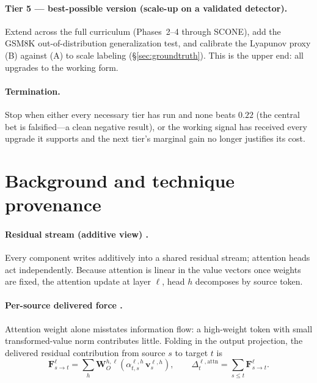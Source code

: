 \documentclass[11pt]{article}
\newcommand{\F}{\mathbf{F}}
\newcommand{\WO}{\mathbf{W}_O}
\newcommand{\vv}{\mathbf{v}}
\begin{document}
\paragraph{Tier 5 --- best-possible version (scale-up on a validated detector).}
Extend across the full curriculum (Phases~2--4 through SCONE), add the GSM8K out-of-distribution
generalization test, and calibrate the Lyapunov proxy (B) against (A) to scale labeling
(\S\ref{sec:groundtruth}). This is the upper end: all upgrades to the working form.

\paragraph{Termination.} Stop when either every necessary tier has run and none beats $0.22$ (the
central bet is falsified---a clean negative result), or the working signal has received every upgrade it
supports and the next tier's marginal gain no longer justifies its cost.

\section{Background and technique provenance}
\label{sec:background}
\paragraph{Residual stream (additive view) \cite{elhage2021mathematical}.}
Every component writes additively into a shared residual stream; attention heads act independently.
Because attention is linear in the value vectors once weights are fixed, the attention update at
layer $\ell$, head $h$ decomposes by source token.

\paragraph{Per-source delivered force \cite{kobayashi2020attention,kobayashi2021incorporating}.}
Attention weight alone misstates information flow: a high-weight token with small transformed-value
norm contributes little. Folding in the output projection, the delivered residual contribution from
source $s$ to target $t$ is
\begin{equation}
\F^{\ell}_{s\to t}=\sum_h \WO^{h,\ell}\!\left(\alpha^{\ell,h}_{t,s}\,\vv^{\ell,h}_s\right),
\qquad
\Delta^{\ell,\mathrm{attn}}_t=\sum_{s\le t}\F^{\ell}_{s\to t}.
\label{eq:F}
\end{equation}
\end{document}
